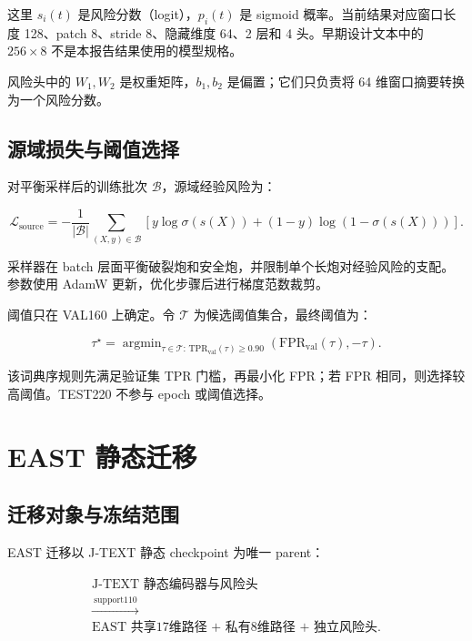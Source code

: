 \documentclass[11pt,a4paper]{article}
\begin{document}
这里 \(s_i(t)\) 是风险分数（logit），\(p_i(t)\) 是 sigmoid 概率。当前结果对应窗口长度 128、patch 8、stride 8、隐藏维度 64、2 层和 4 头。早期设计文本中的 \(256\times8\) 不是本报告结果使用的模型规格。

风险头中的 \(W_1,W_2\) 是权重矩阵，\(b_1,b_2\) 是偏置；它们只负责将 64 维窗口摘要转换为一个风险分数。

\subsection{源域损失与阈值选择}

对平衡采样后的训练批次 \(\mathcal{B}\)，源域经验风险为：

\begin{equation}
\mathcal{L}_{\mathrm{source}}=
-\frac{1}{|\mathcal{B}|}
\sum_{(X,y)\in\mathcal{B}}
\left[
y\log\sigma(s(X))
+(1-y)\log\left(1-\sigma(s(X))\right)
\right].
\label{eq:source-loss}
\end{equation}

采样器在 batch 层面平衡破裂炮和安全炮，并限制单个长炮对经验风险的支配。参数使用 AdamW 更新，优化步骤后进行梯度范数裁剪。

阈值只在 VAL160 上确定。令 \(\mathcal{T}\) 为候选阈值集合，最终阈值为：

\begin{equation}
\tau^\star=
\mathop{\arg\min}_{\tau\in\mathcal{T}:\,
\mathrm{TPR}_{\mathrm{val}}(\tau)\geq0.90}
\left(\mathrm{FPR}_{\mathrm{val}}(\tau),-\tau\right).
\label{eq:threshold}
\end{equation}

该词典序规则先满足验证集 TPR 门槛，再最小化 FPR；若 FPR 相同，则选择较高阈值。TEST220 不参与 epoch 或阈值选择。

\section{EAST 静态迁移}

\subsection{迁移对象与冻结范围}

EAST 迁移以 J-TEXT 静态 checkpoint 为唯一 parent：

\begin{equation}
\begin{gathered}
\text{J-TEXT 静态编码器与风险头}\\
\xrightarrow{\ \mathrm{support110}\ }\\
\text{EAST 共享17维路径 + 私有8维路径 + 独立风险头}.
\end{gathered}
\label{eq:transfer}
\end{equation}
\end{document}
